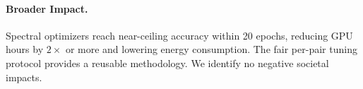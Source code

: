 \paragraph{Broader Impact.}
Spectral optimizers reach near-ceiling accuracy within 20 epochs, reducing GPU hours by $2\times$ or more and lowering energy consumption. The fair per-pair tuning protocol provides a reusable methodology. We identify no negative societal impacts.
